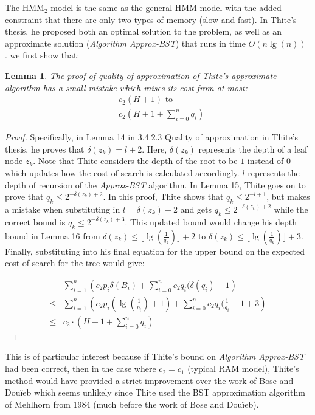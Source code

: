\documentclass[letterpaper,12pt,titlepage,oneside,final]{book}
\theoremstyle{plain}
\newtheorem{lem}[thm]{Lemma}
\begin{document}
The HMM$_2$ model is the same as the general HMM model with the added constraint that there are only two types of memory (slow and fast). In Thite's thesis, he proposed both an optimal solution to the problem, as well as an approximate solution (\textit{Algorithm Approx-BST}) that runs in time $O(n \lg(n))$ \cite{thite2008optimum}. we first show that:
\begin{lem}
The proof of quality of approximation of Thite's approximate algorithm has a small mistake which raises its cost from at most: 
\begin{align*}
&c_2(H+1) \text{ to} \\
&c_2(H+1+\sum_{i=0}^{n}q_i)
\end{align*}
\end{lem}

\begin{proof}
Specifically, in Lemma 14 in 3.4.2.3 Quality of approximation in Thite's thesis, he proves that $\delta(z_k) = l+2$. Here, $\delta(z_k)$ represents the depth of a leaf node $z_k$. Note that Thite considers the depth of the root to be $1$ instead of $0$ which updates how the cost of search is calculated accordingly. $l$ represents the depth of recursion of the \textit{Approx-BST} algorithm. In Lemma 15, Thite goes on to prove that $q_k \leq 2^{-\delta(z_k)+2}$. In this proof, Thite shows that $q_k \leq 2^{-l+1}$, but makes a mistake when substituting in $l=\delta(z_k)-2$ and gets $q_k \leq 2^{-\delta(z_k)+2}$ while the correct bound is $q_k \leq 2^{-\delta(z_k)+3}$. This updated bound would change his depth bound in Lemma 16 from $\delta(z_k) \leq \lfloor \lg(\frac{1}{q_k}) \rfloor + 2$ to $\delta(z_k) \leq \lfloor \lg(\frac{1}{q_k}) \rfloor + 3$. Finally, substituting into his final equation for the upper bound on the expected cost of search for the tree would give:

\begin{align*}
&\sum_{i=1}^{n} \left(c_2 p_i \delta(B_i )+ \sum_{i=0}^{n} c_2 q_i (\delta(q_i)-1 \right)\\
\leq &\sum_{i=1}^{n} \left(c_2 p_i (\lg(\frac{1}{p_i})+1)+ \sum_{i=0}^{n} c_2 q_i (\frac{1}{q_i}-1+3 \right) \\
\leq &c_2 \cdot \left(H+1+\sum_{i=0}^{n}q_i \right)
\end{align*}
\end{proof}

This is of particular interest because if Thite's bound on \textit{Algorithm Approx-BST} had been correct, then in the case where $c_2=c_1$ (typical RAM model), Thite's method would have provided a strict improvement over the work of Bose and Dou\"{i}eb \cite{bose2009efficient} which seems unlikely since Thite used the BST approximation algorithm of Mehlhorn from 1984 \cite{mehlhorn1984sorting} (much before the work of Bose and Dou\"{i}eb).
\end{document}
